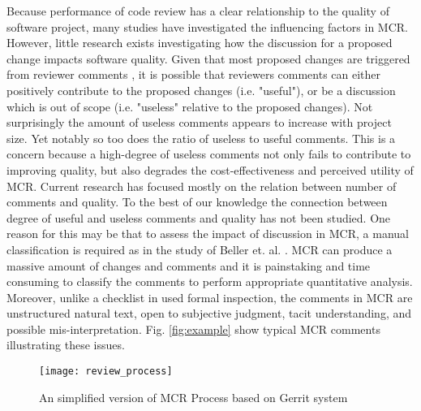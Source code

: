 Because performance of code review has a clear relationship to the quality of software project, many studies have investigated the influencing factors in MCR\cite{Baysal2001,Mcintosh,Beller,Hamasaki2013}. However, little research exists investigating how the discussion for a proposed change impacts software quality. Given that most proposed changes are triggered from reviewer comments \cite{Beller}, 
it is possible that reviewers comments can either positively contribute to the proposed changes (i.e. "useful"), or be a discussion which is out of scope (i.e. "useless" relative to the proposed changes). Not surprisingly the amount of useless comments appears to increase with project size. Yet notably so too does the ratio of useless to useful comments. 
This is a concern because a high-degree of useless comments not only fails to contribute to improving quality, but also degrades the cost-effectiveness and perceived utility of MCR. Current research has focused mostly on the relation between number of comments and quality. To the best of our knowledge the connection between degree of useful and useless comments and quality has not been studied. One reason for this may be that to assess the impact of discussion in MCR, a manual classification is required as in the study of Beller et. al. \cite{Beller}. MCR can produce a massive amount of changes and comments\cite{Balachandran2013,Thongtanunam2014} and it is painstaking and time consuming to classify the comments to perform appropriate quantitative analysis. Moreover, unlike a checklist in used formal inspection, the comments in MCR are unstructured natural text, open to subjective judgment, tacit understanding, and possible mis-interpretation.  Fig. \ref{fig:example} show typical MCR comments illustrating these issues.  
\begin{figure}[!t]
\centering
\texttt{[image: review\_process]}
\caption{An simplified version of MCR Process based on Gerrit system}
\label{fig:process}
\end{figure}

